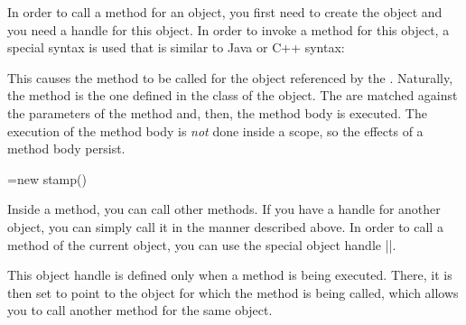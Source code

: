 In order to call a method for an object, you first need to create the
object and you need a handle for this object. In order to invoke a
method for this object, a special syntax is used that is similar to
Java or C++ syntax:

\begin{pgfmanualentry}
  \pgfmanualbody
  This causes the method  to be called for the
  object referenced by the . Naturally, the method
  is the one defined in the class of the object. The 
  are matched against the parameters of the method and, then, the
  method body is executed. The execution of the method body is
  \emph{not} done inside a scope, so the effects of a method body
  persist.

\begin{codeexample}

\pgfoonew \mystamp=new stamp()

\end{codeexample}

  Inside a method, you can call other methods. If you have a handle
  for another object, you can simply call it in the manner described
  above. In order to call a method of the current object, you can use
  the special object handle |\pgfoothis|.

  \begin{command}{\pgfoothis}
    This object handle is defined only when a method is being
    executed. There, it is then set to point to the object for which
    the method is being called, which allows you to call another
    method for the same object.

\begin{codeexample}
\end{codeexample}
  \end{command}
\end{pgfmanualentry}




